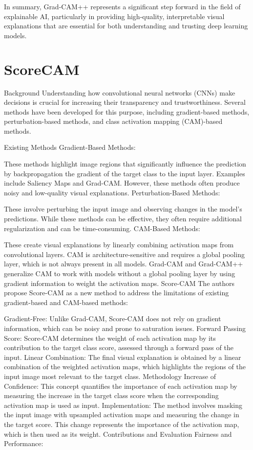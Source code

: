 In summary, Grad-CAM++ represents a significant step forward in the field of explainable AI, particularly in providing high-quality, interpretable visual explanations that are essential for both understanding and trusting deep learning models.

\section{ScoreCAM}
Background
Understanding how convolutional neural networks (CNNs) make decisions is crucial for increasing their transparency and trustworthiness. Several methods have been developed for this purpose, including gradient-based methods, perturbation-based methods, and class activation mapping (CAM)-based methods.

Existing Methods
Gradient-Based Methods:

These methods highlight image regions that significantly influence the prediction by backpropagation the gradient of the target class to the input layer.
Examples include Saliency Maps and Grad-CAM. However, these methods often produce noisy and low-quality visual explanations.
Perturbation-Based Methods:

These involve perturbing the input image and observing changes in the model's predictions.
While these methods can be effective, they often require additional regularization and can be time-consuming.
CAM-Based Methods:

These create visual explanations by linearly combining activation maps from convolutional layers.
CAM is architecture-sensitive and requires a global pooling layer, which is not always present in all models.
Grad-CAM and Grad-CAM++ generalize CAM to work with models without a global pooling layer by using gradient information to weight the activation maps.
Score-CAM
The authors propose Score-CAM as a new method to address the limitations of existing gradient-based and CAM-based methods:

Gradient-Free: Unlike Grad-CAM, Score-CAM does not rely on gradient information, which can be noisy and prone to saturation issues.
Forward Passing Score: Score-CAM determines the weight of each activation map by its contribution to the target class score, assessed through a forward pass of the input.
Linear Combination: The final visual explanation is obtained by a linear combination of the weighted activation maps, which highlights the regions of the input image most relevant to the target class.
Methodology
Increase of Confidence: This concept quantifies the importance of each activation map by measuring the increase in the target class score when the corresponding activation map is used as input.
Implementation:
The method involves masking the input image with upsampled activation maps and measuring the change in the target score.
This change represents the importance of the activation map, which is then used as its weight.
Contributions and Evaluation
Fairness and Performance:

